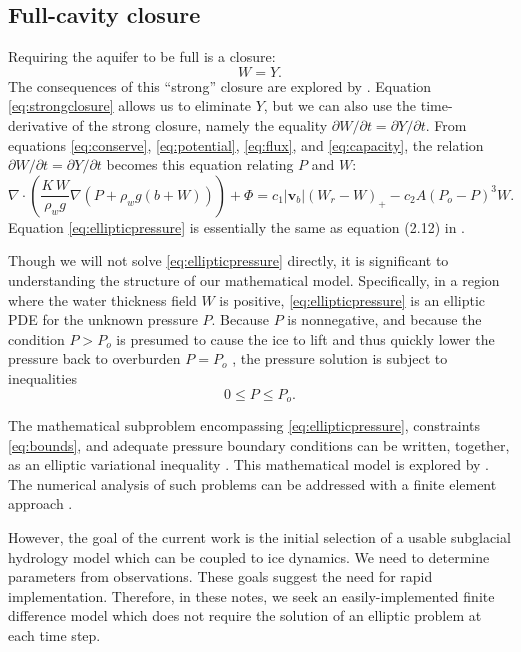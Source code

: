 \documentclass[11pt,final]{amsart}%
\newcommand\bv{\mathbf{v}}
\newcommand{\Div}{\nabla\cdot}
\newcommand{\grad}{\nabla}
\begin{document}
\subsection*{Full-cavity closure}  Requiring the aquifer to be full is a closure:
\begin{equation}
W = Y.\label{eq:strongclosure}
\end{equation}
The consequences of this ``strong'' closure are explored by \cite{Schoofetal2012}.  Equation \eqref{eq:strongclosure} allows us to eliminate $Y$, but we can also use the time-derivative of the strong closure, namely the equality $\partial W/\partial t = \partial Y/\partial t$.  From equations \eqref{eq:conserve}, \eqref{eq:potential}, \eqref{eq:flux}, and \eqref{eq:capacity}, the relation $\partial W/\partial t = \partial Y/\partial t$ becomes this equation relating $P$ and $W$:
\begin{equation}
\Div \left(\frac{K\,W}{\rho_w g} \grad \left(P + \rho_w g (b+W)\right) \right) + \Phi = c_1 |\bv_b| (W_r - W)_+ - c_2 A (P_o - P)^3 W.\label{eq:ellipticpressure}
\end{equation}
Equation \eqref{eq:ellipticpressure} is essentially the same as equation (2.12) in \citep{Schoofetal2012}.

Though we will not solve \eqref{eq:ellipticpressure} directly, it is significant to understanding the structure of our mathematical model.  Specifically, in a region where the water thickness field $W$ is positive, \eqref{eq:ellipticpressure} is an elliptic PDE for the unknown pressure $P$.  Because $P$ is nonnegative, and because the condition $P>P_o$ is presumed to cause the ice to lift and thus quickly lower the pressure back to overburden $P=P_o$ \citep{Schoofetal2012}, the pressure solution is subject to inequalities
\begin{equation}
0 \le P \le P_o. \label{eq:bounds}
\end{equation}

The mathematical subproblem encompassing \eqref{eq:ellipticpressure}, constraints \eqref{eq:bounds}, and adequate pressure boundary conditions can be written, together, as an elliptic variational inequality \citep{KinderlehrerStampacchia}.  This mathematical model is explored by \cite{Schoofetal2012}.  The numerical analysis of such problems can be addressed with a finite element approach \citep[e.g.][]{SchoofStream,JouvetBueler2012}.

However, the goal of the current work is the initial selection of a usable subglacial hydrology model which can be coupled to ice dynamics.  We need to determine parameters from observations.  These goals suggest the need for rapid implementation.  Therefore, in these notes, we seek an easily-implemented finite difference model which does not require the solution of an elliptic problem at each time step.
\end{document}
